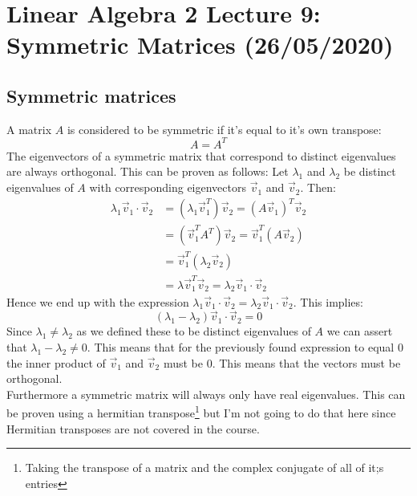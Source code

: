\documentclass[11pt, a4paper]{article}
\begin{document}
\setcounter{section}{8}
\setcounter{equation}{0}

\section{Linear Algebra 2 Lecture 9: Symmetric Matrices (26/05/2020)}


\subsection{Symmetric matrices}
A matrix $A$ is considered to be symmetric if it's equal to it's own transpose:
\begin{equation}
  A = A^T
\end{equation}
The eigenvectors of a symmetric matrix that correspond to distinct eigenvalues are always orthogonal. This can be proven as follows: Let $\lambda_1$ and $\lambda_2$ be distinct eigenvalues of $A$ with corresponding eigenvectors $\vec{v}_1$ and $\vec{v}_2$. Then:
\begin{align*}
  \lambda_1 \vec{v}_1 \cdot \vec{v}_2 &= (\lambda_1 \vec{v}_1^T)\vec{v}_2 = (A\vec{v}_1)^T\vec{v}_2\\
  &= (\vec{v}_1^TA^T) \vec{v}_2 = \vec{v}_1^T(A\vec{v}_2)\\
  &= \vec{v}_1^T(\lambda_2 \vec{v}_2)\\
  &= \lambda \vec{v}_1^T\vec{v}_2 = \lambda_2 \vec{v}_1 \cdot \vec{v}_2
\end{align*}
Hence we end up with the expression $\lambda_1 \vec{v}_1 \cdot \vec{v}_2 = \lambda_2 \vec{v}_1 \cdot \vec{v}_2$. This implies:
\begin{equation*}
  (\lambda_1 - \lambda_2)\vec{v}_1 \cdot \vec{v}_2 = 0
\end{equation*}
Since $\lambda_1 \neq \lambda_2$ as we defined these to be distinct eigenvalues of $A$ we can assert that $\lambda_1 - \lambda_2 \neq 0$. This means that for the previously found expression to equal $0$ the inner product of $\vec{v}_1$ and $\vec{v}_2$ must be $0$. This means that the vectors must be orthogonal.\\
Furthermore a symmetric matrix will always only have real eigenvalues. This can be proven using a hermitian transpose\footnote{Taking the transpose of a matrix and the complex conjugate of all of it;s entries} but I'm not going to do that here since Hermitian transposes are not covered in the course.
\end{document}
